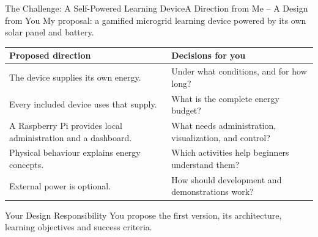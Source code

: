 \begin{frame}{The Challenge: A Self-Powered Learning Device}{A Direction from Me -- A Design from You}
My proposal: a gamified microgrid learning device powered by its own solar panel and battery.
\vspace{.5em}
\small\renewcommand{\arraystretch}{1.35}
\par\noindent\begin{tabularx}{\textwidth}{@{}>{\raggedright\arraybackslash}p{}>{\raggedright\arraybackslash}X@{}}
\toprule
\textbf{Proposed direction} & \textbf{Decisions for you}\\\midrule
The device supplies its own energy. & Under what conditions, and for how long?\\
Every included device uses that supply. & What is the complete energy budget?\\
A Raspberry Pi provides local administration and a dashboard. & What needs administration, visualization, and control?\\
Physical behaviour explains energy concepts. & Which activities help beginners understand them?\\
External power is optional. & How should development and demonstrations work?\\\bottomrule
\end{tabularx}\par
\begin{alertblock}{Your Design Responsibility}
You propose the first version, its architecture, learning objectives and success criteria.
\end{alertblock}
\end{frame}

